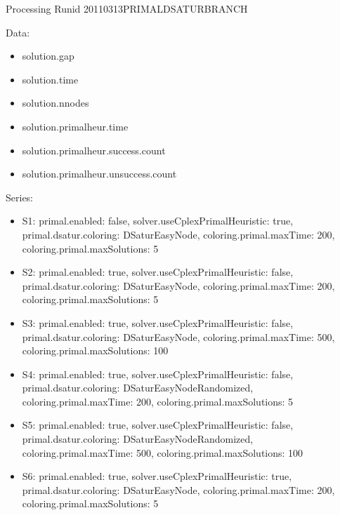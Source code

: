 \documentclass[landscape, 12pt]{report}
\begin{document}
Processing Runid 20110313PRIMALDSATURBRANCH

Data:
\begin{itemize}
\item solution.gap
\item solution.time
\item solution.nnodes
\item solution.primalheur.time
\item solution.primalheur.success.count
\item solution.primalheur.unsuccess.count
\end{itemize}
Series:
\begin{itemize}
\item S1: primal.enabled: false, solver.useCplexPrimalHeuristic: true, primal.dsatur.coloring: DSaturEasyNode, coloring.primal.maxTime: 200, coloring.primal.maxSolutions: 5
\item S2: primal.enabled: true, solver.useCplexPrimalHeuristic: false, primal.dsatur.coloring: DSaturEasyNode, coloring.primal.maxTime: 200, coloring.primal.maxSolutions: 5
\item S3: primal.enabled: true, solver.useCplexPrimalHeuristic: false, primal.dsatur.coloring: DSaturEasyNode, coloring.primal.maxTime: 500, coloring.primal.maxSolutions: 100
\item S4: primal.enabled: true, solver.useCplexPrimalHeuristic: false, primal.dsatur.coloring: DSaturEasyNodeRandomized, coloring.primal.maxTime: 200, coloring.primal.maxSolutions: 5
\item S5: primal.enabled: true, solver.useCplexPrimalHeuristic: false, primal.dsatur.coloring: DSaturEasyNodeRandomized, coloring.primal.maxTime: 500, coloring.primal.maxSolutions: 100
\item S6: primal.enabled: true, solver.useCplexPrimalHeuristic: true, primal.dsatur.coloring: DSaturEasyNode, coloring.primal.maxTime: 200, coloring.primal.maxSolutions: 5
\end{itemize}
\end{document}
